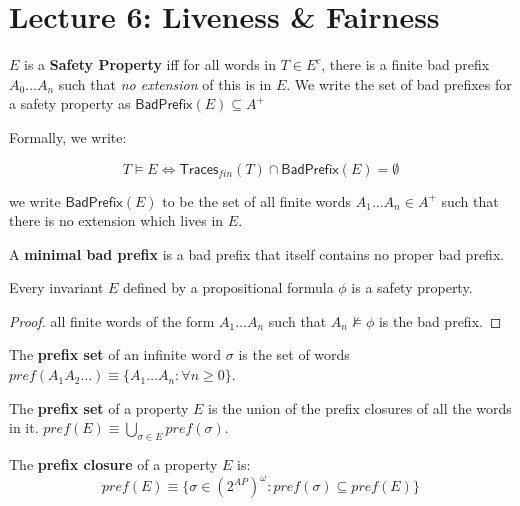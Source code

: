 \newcommand{\badpref}{\ensuremath{\textsf{BadPrefix}}}
\newcommand{\badprefix}{\badpref}

\newcommand{\tracesfin}{\ensuremath{\textsf{Traces}_{fin}}}

\chapter{Lecture 6: Liveness \& Fairness}

\begin{definition}
$E$ is a \textbf{Safety Property} iff for all words in $T \in E^c$, there is a finite bad prefix $A_0 \dots A_n$ such that \emph{no extension}
of this is in $E$. We write the set of bad prefixes for a safety property as $\badpref(E) \subseteq A^+$
\end{definition}
Formally, we write:

$$
T \models E \iff \tracesfin(T) \cap \badpref(E) = \emptyset
$$


we write $\badpref(E)$ to be the set of all finite words $A_1 \dots A_n \in A^+$ such that there is no extension which lives in $E$.

\begin{definition}
A \textbf{minimal bad prefix} is a bad prefix that itself contains no proper bad prefix.
\end{definition}


\begin{theorem}
Every invariant $E$ defined by a propositional formula $\phi$ is a safety property.
\end{theorem}
\begin{proof}
all finite words of the form $A_1 \dots A_n$ such that $A_n \not \models \phi$ is the bad prefix.
\end{proof}

\begin{definition}
The \textbf{prefix set} of an infinite word
$\sigma$ is the set of words
$pref(A_1 A_2 \dots) \equiv \{ A_1 \dots A_n : \forall n \geq 0 \}$.
\end{definition}


\begin{definition}
The \textbf{prefix set} of a property $E$ is the union of the prefix closures of all the words in it.  $pref(E) \equiv \bigcup_{\sigma \in E} pref(\sigma)$.
\end{definition}

\begin{definition}
The \textbf{prefix closure} of a property $E$ is:
$$
pref(E) \equiv \{ \sigma \in (2^{AP})^\omega : pref(\sigma) \subseteq pref(E) \}
$$
\end{definition}


